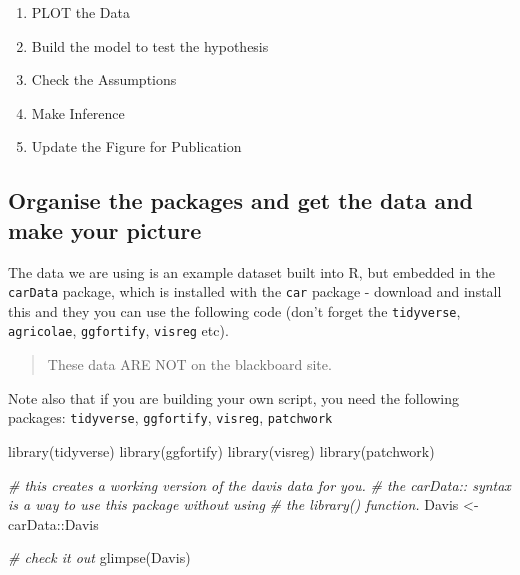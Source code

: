 \documentclass[
]{book}
\newenvironment{Shaded}{\begin{snugshade}}{\end{snugshade}}
\newcommand{\CommentTok}[1]{\textcolor[rgb]{0.56,0.35,0.01}{\textit{#1}}}
\newcommand{\FunctionTok}[1]{\textcolor[rgb]{0.00,0.00,0.00}{#1}}
\newcommand{\NormalTok}[1]{#1}
\newcommand{\OtherTok}[1]{\textcolor[rgb]{0.56,0.35,0.01}{#1}}
\newcommand{\SpecialCharTok}[1]{\textcolor[rgb]{0.00,0.00,0.00}{#1}}
\providecommand{\tightlist}{%
  \setlength{\itemsep}{0pt}\setlength{\parskip}{0pt}}
\begin{document}
\begin{enumerate}
\def\labelenumi{\arabic{enumi})}
\tightlist
\item
  PLOT the Data
\item
  Build the model to test the hypothesis
\item
  Check the Assumptions
\item
  Make Inference
\item
  Update the Figure for Publication
\end{enumerate}

\hypertarget{organise-the-packages-and-get-the-data-and-make-your-picture}{%
\subsection{Organise the packages and get the data and make your picture}\label{organise-the-packages-and-get-the-data-and-make-your-picture}}

The data we are using is an example dataset built into R, but embedded in the \texttt{carData} package, which is installed with the \texttt{car} package - download and install this and they you can use the following code (don't forget the \texttt{tidyverse}, \texttt{agricolae}, \texttt{ggfortify}, \texttt{visreg} etc).

\begin{quote}
These data ARE NOT on the blackboard site.
\end{quote}

Note also that if you are building your own script, you need the following packages: \texttt{tidyverse}, \texttt{ggfortify}, \texttt{visreg}, \texttt{patchwork}

\begin{Shaded}
\begin{Highlighting}[]
\FunctionTok{library}\NormalTok{(tidyverse)}
\FunctionTok{library}\NormalTok{(ggfortify)}
\FunctionTok{library}\NormalTok{(visreg)}
\FunctionTok{library}\NormalTok{(patchwork)}

\CommentTok{\# this creates a working version of the davis data for you.}
\CommentTok{\# the carData:: syntax is a way to use this package without using}
\CommentTok{\# the library() function.}
\NormalTok{Davis }\OtherTok{\textless{}{-}}\NormalTok{ carData}\SpecialCharTok{::}\NormalTok{Davis}

\CommentTok{\# check it out}
\FunctionTok{glimpse}\NormalTok{(Davis)}
\end{Highlighting}
\end{Shaded}
\end{document}
